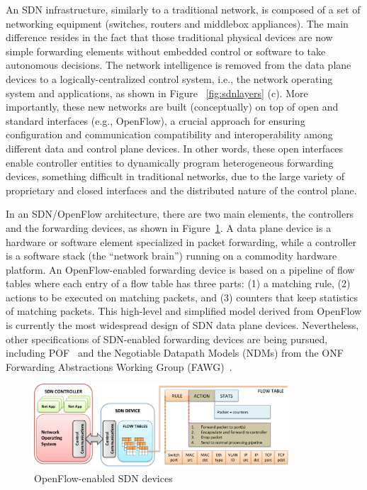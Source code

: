 An SDN infrastructure, similarly to a traditional network, is composed of a set of networking 
equipment (switches, routers and middlebox appliances). The main difference resides in 
the fact that those traditional physical devices are now simple forwarding elements 
without embedded control or software to take autonomous decisions. The network intelligence is 
removed from the data plane devices to a logically-centralized control system, i.e., the network 
operating system and applications, as shown in Figure ~\ref{fig:sdnlayers} (c).
More importantly, these new networks are built (conceptually) on top of open and standard 
interfaces (e.g., OpenFlow), a crucial approach for ensuring  configuration and communication 
compatibility and interoperability among different data and control plane devices. In other words, 
these open interfaces enable controller entities to dynamically program heterogeneous forwarding 
devices, something difficult in traditional networks, due to the large variety of 
proprietary and closed interfaces and the distributed nature of the control plane.

In an SDN/OpenFlow architecture, there are two main elements, the controllers and the forwarding 
devices, as shown in Figure~\ref{fig:sdnopenflowswitch}. A data plane device is a hardware or software 
element specialized in packet forwarding, while a controller is a software stack (the ``network brain'') 
running on a commodity hardware platform. An OpenFlow-enabled forwarding device is based on a pipeline of 
flow tables where each entry of a flow table has three parts: (1) a matching rule, (2) actions to be executed 
on matching packets, and (3) counters that keep statistics of matching packets. This high-level and simplified model derived from OpenFlow is currently  the most widespread design of SDN data plane devices. Nevertheless, other specifications of SDN-enabled forwarding devices are being pursued, including POF~\cite{song2013,song2013-1} and the  Negotiable Datapath Models (NDMs) from the ONF Forwarding Abstractions Working Group (FAWG)~\cite{onf2013}.

\begin{figure}[ht!]
\centering
\includegraphics[width=0.85\textwidth]{figures/fig6_sdn_devices_openflow.pdf}
\caption{OpenFlow-enabled SDN devices}
\label{fig:sdnopenflowswitch}
\end{figure}

